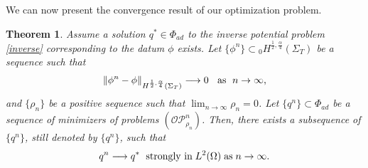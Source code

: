 \documentclass[a4paper,12pt,reqno,natbib]{amsart}
\newtheorem{theorem}{Theorem}
\def\ds{\displaystyle}
\begin{document}
{We can now present the convergence result of our optimization problem.



\begin{theorem}Assume a solution $q^*\in\Phi_{ad}$ to the inverse potential problem \eqref{inverse} corresponding to the datum $\phi$ exists.
Let $\{ \phi^n \} \subset {}_0H^{\frac{1}{2},\frac{\alpha}{4} }\left(\Sigma_{T}\right)$ be a sequence such that 
\begin{align*}
    \| \phi^n -\phi \|_{H^{\frac{1}{2},\frac{\alpha}{4} }\left(\Sigma_{T}\right)} \longrightarrow 0 \; \; \hbox{  as  } \; n \rightarrow \infty,
\end{align*}
and $\{\rho_n\}$ be a positive sequence such that $\ds\lim_{n\to\infty}\rho_n=0$. Let $\{ q^n \}\subset\Phi_{ad}$ be a sequence of minimizers of problems $(\mathcal{O}\mathcal{P}_{\rho_n}^n)$. Then, there exists a subsequence of $\{ q^n \}$, still denoted
by $\{ q^n \}$, such that
\begin{align*}
q^n\longrightarrow q^* \; \hbox{  strongly in}\; L^2(\Omega)\; \hbox{as}\; n\rightarrow\infty.
\end{align*}
\end{theorem}


}
\end{document}
